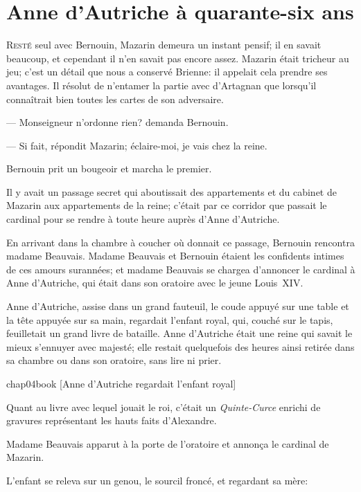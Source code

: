 \chapter{Anne d'Autriche à quarante-six ans}

\lettrine{R}{esté} seul avec Bernouin, Mazarin demeura un instant pensif; il en savait beaucoup, et cependant il n'en savait pas encore assez. Mazarin était tricheur au jeu; c'est un détail que nous a conservé Brienne: il appelait cela prendre ses avantages. Il résolut de n'entamer la partie avec d'Artagnan que lorsqu'il connaîtrait bien toutes les cartes de son adversaire.

— Monseigneur n'ordonne rien? demanda Bernouin.

— Si fait, répondit Mazarin; éclaire-moi, je vais chez la reine.

Bernouin prit un bougeoir et marcha le premier.

Il y avait un passage secret qui aboutissait des appartements et du cabinet de Mazarin aux appartements de la reine; c'était par ce corridor que passait le cardinal pour se rendre à toute heure auprès d'Anne d'Autriche.

En arrivant dans la chambre à coucher où donnait ce passage, Bernouin rencontra madame Beauvais. Madame Beauvais et Bernouin étaient les confidents intimes de ces amours surannées; et madame Beauvais se chargea d'annoncer le cardinal à Anne d'Autriche, qui était dans son oratoire avec le jeune Louis~XIV.

Anne d'Autriche, assise dans un grand fauteuil, le coude appuyé sur une table et la tête appuyée sur sa main, regardait l'enfant royal, qui, couché sur le tapis, feuilletait un grand livre de bataille. Anne d'Autriche était une reine qui savait le mieux s'ennuyer avec majesté; elle restait quelquefois des heures ainsi retirée dans sa chambre ou dans son oratoire, sans lire ni prier.

\begin{bwbigpic}
	[\basicscale] 
	{chap04book}
	[Anne d'Autriche regardait l'enfant royal]
\end{bwbigpic}

Quant au livre avec lequel jouait le roi, c'était un \textit{Quinte-Curce} enrichi de gravures représentant les hauts faits d'Alexandre.

Madame Beauvais apparut à la porte de l'oratoire et annonça le cardinal de Mazarin.

L'enfant se releva sur un genou, le sourcil froncé, et regardant sa mère:


